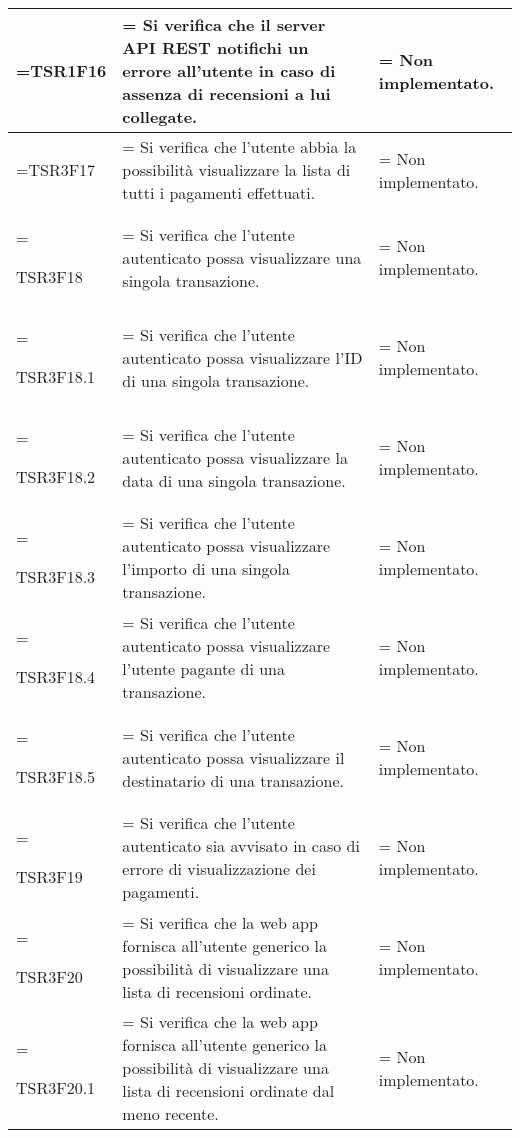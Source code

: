 \begin{xltabular}{\textwidth} {
        >{\hsize\linewidth=\hsize}X
        >{\hsize\linewidth=\hsize}X
        >{\hsize\linewidth=\hsize}X
    }
    TSR1F16 &
    Si verifica che il server API REST notifichi un errore all'utente in caso di assenza di recensioni a lui collegate. &
    Non implementato.
    \\ \hline


    TSR3F17 &
    Si verifica che l'utente abbia la possibilità visualizzare la lista di tutti i pagamenti
    effettuati. &
    Non implementato.
    \\ \hline

    TSR3F18 &
    Si verifica che l'utente autenticato possa visualizzare una singola transazione. &
    Non implementato.
    \\ \hline

    TSR3F18.1 &
    Si verifica che l'utente autenticato possa visualizzare l'ID di una singola transazione. &
    Non implementato.
    \\ \hline


    TSR3F18.2 &
    Si verifica che l'utente autenticato possa visualizzare la data di una singola transazione. &
    Non implementato.
    \\ \hline

    TSR3F18.3 &
    Si verifica che l'utente autenticato possa visualizzare l'importo di una singola transazione. &
    Non implementato.
    \\ \hline

    TSR3F18.4 &
    Si verifica che l'utente autenticato possa visualizzare l'utente pagante di una transazione. &
    Non implementato.
    \\ \hline

    TSR3F18.5 &
    Si verifica che l'utente autenticato possa visualizzare il destinatario di una transazione. &
    Non implementato.
    \\ \hline

    TSR3F19 &
    Si verifica che l'utente autenticato sia avvisato in caso di errore di visualizzazione dei pagamenti. &
    Non implementato.
    \\ \hline

    TSR3F20 &
    Si verifica che la web app fornisca all'utente generico la possibilità di visualizzare una lista di recensioni ordinate. &
    Non implementato. 
    \\ \hline

    TSR3F20.1 &
    Si verifica che la web app fornisca all'utente generico la possibilità di visualizzare una lista di recensioni ordinate dal meno recente. &
    Non implementato. 
    \\ \hline


\end{xltabular}
